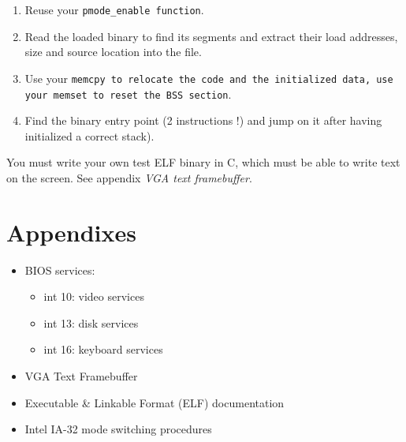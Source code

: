 \begin{itemize}
\begin{enumerate}
    \item {Reuse your \tt pmode\_enable \rm function}.

    \item {Read the loaded binary to find its segments and extract
    their load addresses, size and source location into the file}.

    \item {Use your \tt memcpy \rm to relocate the code and the
    initialized data, use your \tt memset \rm to reset the BSS section}.

    \item {Find the binary entry point (2 instructions !) and jump on
    it after having initialized a correct stack)}.

  \end{enumerate}

You must write your own test ELF binary in C, which must be able to
write text on the screen. See appendix \emph{VGA text framebuffer}.

\newpage

\section{Appendixes}

\begin{itemize}
\item
  BIOS services:
  \begin{itemize}
  \item
    int 10: video services
  \item
    int 13: disk services
  \item
    int 16: keyboard services
  \end{itemize}
\item
  VGA Text Framebuffer
\item
  Executable \& Linkable Format (ELF) documentation
\item
  Intel IA-32 mode switching procedures
\end{itemize}
\end{itemize}
%
%
















